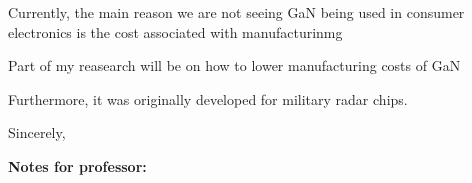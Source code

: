 \documentclass[letterpaper]{letter}
\begin{document}
\begin{letter}
Currently, the main reason we are not seeing GaN being used in consumer electronics is the cost associated with manufacturinmg




Part of my reasearch will be on how to lower manufacturing costs of GaN



Furthermore, it was originally developed for military radar chips.

\lipsum[3]
\closing{Sincerely,}

\end{letter}
\newpage
\textbf{Notes for professor:}
\end{document}

